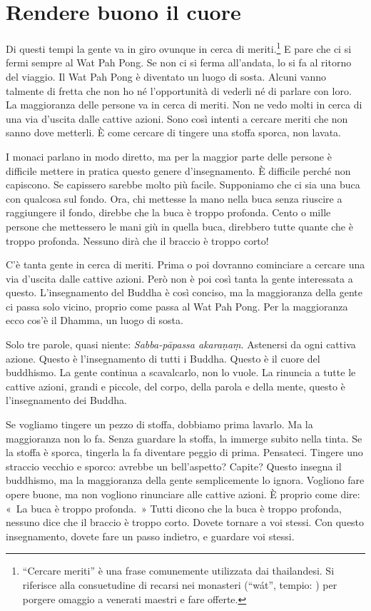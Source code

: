 \chapter{Rendere buono il cuore}

Di questi tempi la gente va in giro ovunque in cerca di
meriti.\footnote{``Cercare meriti'' è una frase comunemente utilizzata
  dai thailandesi. Si riferisce alla consuetudine di recarsi nei
  monasteri (``wát'', tempio: ) per porgere omaggio a venerati
  maestri e fare offerte.} E pare che ci si fermi sempre al Wat Pah
Pong. Se non ci si ferma all'andata, lo si fa al ritorno del viaggio. Il
Wat Pah Pong è diventato un luogo di sosta. Alcuni vanno talmente di
fretta che non ho né l'opportunità di vederli né di parlare con loro. La
maggioranza delle persone va in cerca di meriti. Non ne vedo molti in
cerca di una via d'uscita dalle cattive azioni. Sono così intenti a
cercare meriti che non sanno dove metterli. È come cercare di tingere
una stoffa sporca, non lavata.

I monaci parlano in modo diretto, ma per la maggior parte delle persone
è difficile mettere in pratica questo genere d'insegnamento. È
difficile perché non capiscono. Se capissero sarebbe molto più facile.
Supponiamo che ci sia una buca con qualcosa sul fondo. Ora, chi mettesse
la mano nella buca senza riuscire a raggiungere il fondo, direbbe che la
buca è troppo profonda. Cento o mille persone che mettessero le mani giù
in quella buca, direbbero tutte quante che è troppo profonda. Nessuno
dirà che il braccio è troppo corto!

C'è tanta gente in cerca di meriti. Prima o poi dovranno cominciare a
cercare una via d'uscita dalle cattive azioni. Però non è poi così tanta
la gente interessata a questo. L'insegnamento del Buddha è così conciso,
ma la maggioranza della gente ci passa solo vicino, proprio come passa
al Wat Pah Pong. Per la maggioranza ecco cos'è il Dhamma, un luogo di
sosta.

Solo tre parole, quasi niente: \emph{Sabba-pāpassa akaraṇaṃ}. Astenersi
da ogni cattiva azione. Questo è l'insegnamento di tutti i Buddha.
Questo è il cuore del buddhismo. La gente continua a scavalcarlo, non lo
vuole. La rinuncia a tutte le cattive azioni, grandi e piccole, del
corpo, della parola e della mente, questo è l'insegnamento dei Buddha.

Se vogliamo tingere un pezzo di stoffa, dobbiamo prima lavarlo. Ma la
maggioranza non lo fa. Senza guardare la stoffa, la immerge subito nella
tinta. Se la stoffa è sporca, tingerla la fa diventare peggio di prima.
Pensateci. Tingere uno straccio vecchio e sporco: avrebbe un
bell'aspetto? Capite? Questo insegna il buddhismo, ma la maggioranza
della gente semplicemente lo ignora. Vogliono fare opere buone, ma non
vogliono rinunciare alle cattive azioni. È proprio come dire: «~La buca
è troppo profonda.~» Tutti dicono che la buca è troppo profonda, nessuno
dice che il braccio è troppo corto. Dovete tornare a voi stessi. Con
questo insegnamento, dovete fare un passo indietro, e guardare voi
stessi.

